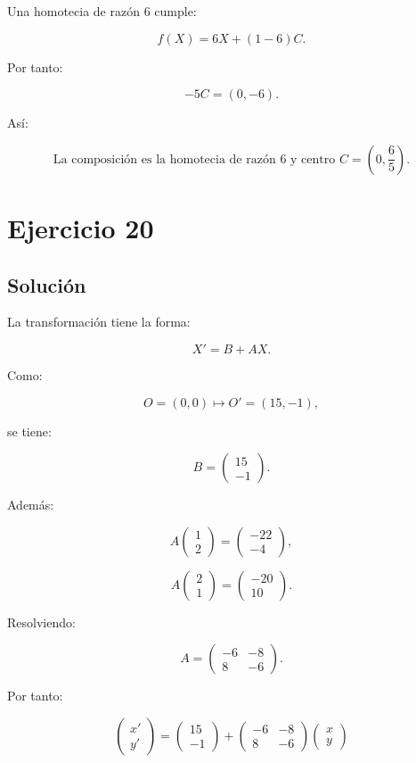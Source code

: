 \documentclass[11pt,a4paper]{article}
\begin{document}
Una homotecia de razón \(6\) cumple:

\[
f(X)=6X+(1-6)C.
\]

Por tanto:

\[
-5C=(0,-6).
\]

Así:

\[
\boxed{
\text{La composición es la homotecia de razón }6
\text{ y centro }
C=
\left(
0,\frac65
\right).
}
\]

\section{Ejercicio 20}
\subsection{Solución}

La transformación tiene la forma:

\[
X'=B+AX.
\]

Como:

\[
O=(0,0)
\longmapsto
O'=(15,-1),
\]

se tiene:

\[
B=
\begin{pmatrix}
15\\
-1
\end{pmatrix}.
\]

Además:

\[
A
\begin{pmatrix}
1\\
2
\end{pmatrix}
=
\begin{pmatrix}
-22\\
-4
\end{pmatrix},
\]

\[
A
\begin{pmatrix}
2\\
1
\end{pmatrix}
=
\begin{pmatrix}
-20\\
10
\end{pmatrix}.
\]

Resolviendo:

\[
A=
\begin{pmatrix}
-6&-8\\
8&-6
\end{pmatrix}.
\]

Por tanto:

\[
\boxed{
\begin{pmatrix}
x'\\
y'
\end{pmatrix}
=
\begin{pmatrix}
15\\
-1
\end{pmatrix}
+
\begin{pmatrix}
-6&-8\\
8&-6
\end{pmatrix}
\begin{pmatrix}
x\\
y
\end{pmatrix}
}
\]
\end{document}
